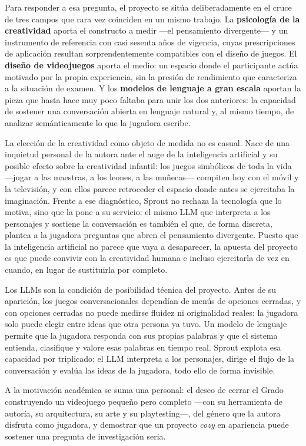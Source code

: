 \documentclass[12pt,twoside,titlepage]{report}
\begin{document}
Para responder a esa pregunta, el proyecto se sitúa deliberadamente en el cruce de tres campos que rara vez coinciden en un mismo trabajo. La \textbf{psicología de la creatividad} aporta el constructo a medir ---el pensamiento divergente--- y un instrumento de referencia con casi sesenta años de vigencia, cuyas prescripciones de aplicación resultan sorprendentemente compatibles con el diseño de juegos. El \textbf{diseño de videojuegos} aporta el medio: un espacio donde el participante actúa motivado por la propia experiencia, sin la presión de rendimiento que caracteriza a la situación de examen. Y los \textbf{modelos de lenguaje a gran escala} aportan la pieza que hasta hace muy poco faltaba para unir los dos anteriores: la capacidad de sostener una conversación abierta en lenguaje natural y, al mismo tiempo, de analizar semánticamente lo que la jugadora escribe.

La elección de la creatividad como objeto de medida no es casual. Nace de una inquietud personal de la autora ante el auge de la inteligencia artificial y su posible efecto sobre la creatividad infantil: los juegos simbólicos de toda la vida —jugar a las maestras, a los leones, a las muñecas— compiten hoy con el móvil y la televisión, y con ellos parece retroceder el espacio donde antes se ejercitaba la imaginación. Frente a ese diagnóstico, Sprout no rechaza la tecnología que lo motiva, sino que la pone a su servicio: el mismo LLM que interpreta a los personajes y sostiene la conversación es también el que, de forma discreta, plantea a la jugadora preguntas que abren el pensamiento divergente. Puesto que la inteligencia artificial no parece que vaya a desaparecer, la apuesta del proyecto es que puede convivir con la creatividad humana e incluso ejercitarla de vez en cuando, en lugar de sustituirla por completo.

Los LLMs son la condición de posibilidad técnica del proyecto. Antes de su aparición, los juegos conversacionales dependían de menús de opciones cerradas, y con opciones cerradas no puede medirse fluidez ni originalidad reales: la jugadora solo puede elegir entre ideas que otra persona ya tuvo. Un modelo de lenguaje permite que la jugadora responda con sus propias palabras y que el sistema entienda, clasifique y valore esas palabras en tiempo real. Sprout explota esa capacidad por triplicado: el LLM interpreta a los personajes, dirige el flujo de la conversación y evalúa las ideas de la jugadora, todo ello de forma invisible.

A la motivación académica se suma una personal: el deseo de cerrar el Grado construyendo un videojuego pequeño pero completo ---con su herramienta de autoría, su arquitectura, su arte y su playtesting---, del género que la autora disfruta como jugadora, y demostrar que un proyecto \textit{cozy} en apariencia puede sostener una pregunta de investigación seria.
\end{document}

